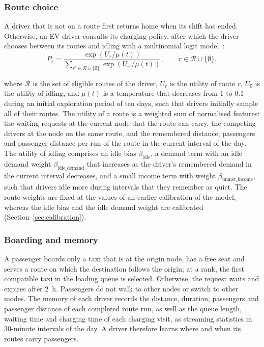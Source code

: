 \subsubsection{Route choice}
\label{app:abm_choice}

A driver that is not on a route first returns home when its shift has ended. Otherwise, an EV driver consults its charging policy, after which the driver chooses between its routes and idling with a multinomial logit model~\cite{mcfadden1974_mnl}:
\begin{equation}
    P_r = \frac{\exp\left(U_r / \mu(t)\right)}{\sum_{r' \in \mathcal{R} \cup \{\emptyset\}} \exp\left(U_{r'} / \mu(t)\right)}, \qquad r \in \mathcal{R} \cup \{\emptyset\},
\end{equation}

\noindent where \( \mathcal{R} \) is the set of eligible routes of the driver, \( U_r \) is the utility of route \( r \), \( U_\emptyset \) is the utility of idling, and \( \mu(t) \) is a temperature that decreases from 1 to 0.1 during an initial exploration period of ten days, such that drivers initially sample all of their routes. The utility of a route is a weighted sum of normalised features: the waiting requests at the current node that the route can carry, the competing drivers at the node on the same route, and the remembered distance, passengers and passenger distance per run of the route in the current interval of the day. The utility of idling comprises an idle bias \( \beta_{\text{idle}} \), a demand term with an idle demand weight \( \beta_{\text{idle\_demand}} \) that increases as the driver's remembered demand in the current interval decreases, and a small income term with weight \( \beta_{\text{unmet\_income}} \), such that drivers idle more during intervals that they remember as quiet. The route weights are fixed at the values of an earlier calibration of the model, whereas the idle bias and the idle demand weight are calibrated (Section~\ref{sec:calibration}).

\subsubsection{Boarding and memory}
\label{app:abm_boarding}

A passenger boards only a taxi that is at the origin node, has a free seat and serves a route on which the destination follows the origin; at a rank, the first compatible taxi in the loading queue is selected. Otherwise, the request waits and expires after 2~h. Passengers do not walk to other nodes or switch to other modes. The memory of each driver records the distance, duration, passengers and passenger distance of each completed route run, as well as the queue length, waiting time and charging time of each charging visit, as streaming statistics in 30-minute intervals of the day. A driver therefore learns where and when its routes carry passengers.

